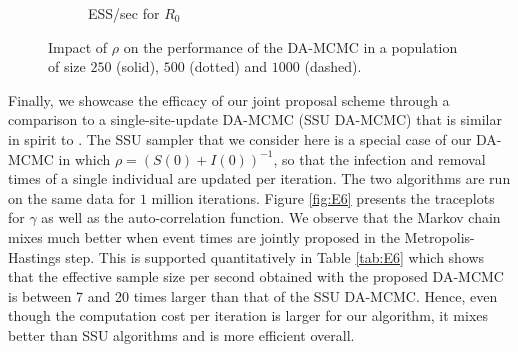 \documentclass[11pt]{article}
\newcommand{\ram}[1]{{\color{green}{ #1}}}
\begin{document}
\begin{figure}
\begin{subfigure}[b]{0.32\textwidth}
			\caption{ESS/sec for $R_0$
			}
			\label{fig:E3_facet_ESSsecR0}
		\end{subfigure}
		\caption{Impact of $\rho$ on the performance of the DA-MCMC in a population of size $250$ (solid), $500$ (dotted) and $1000$ (dashed).}
		\label{fig:E3}
	\end{figure}
		
	Finally, we showcase the efficacy of our joint proposal scheme through a comparison %
	to a single-site-update DA-MCMC (SSU DA-MCMC) that is similar in spirit to \cite{Gibson.1998, ONeill.1999, Fintzi.2017}. The SSU sampler that we consider here is a special case of our DA-MCMC in which $\rho = (S(0)+I(0))^{-1}$, so that the infection and removal times of a single individual are updated per iteration. The two algorithms are run on the same data for $1$ million iterations. Figure \ref{fig:E6} presents the traceplots for $\gamma$ as well as the auto-correlation function. We observe that the Markov chain mixes much better when event times are jointly proposed in the Metropolis-Hastings step. This is supported quantitatively in Table \ref{tab:E6} which shows that the effective sample size per second obtained with the proposed DA-MCMC is between 7 and 20 times larger than that of the SSU DA-MCMC. Hence, even though the computation cost per iteration is larger for our algorithm, it mixes better than SSU algorithms and is more efficient overall.
	
	\ram{RJ-MCMC, saturation -- when mention other papers}
	
 \ram{explain why not compare chain binomial, particle filtering (forward simulation), LNA requires noisy data -- at beginning of section e.g.\ Lam's paper.}
	
\end{document}
